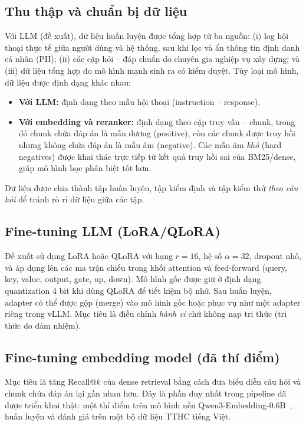 \subsection{Thu thập và chuẩn bị dữ liệu}

Với LLM (đề xuất), dữ liệu huấn luyện được tổng hợp từ ba nguồn: (i) log hội thoại thực tế
giữa người dùng và hệ thống, sau khi lọc và ẩn thông tin định danh cá nhân (PII); (ii) các
cặp hỏi -- đáp chuẩn do chuyên gia nghiệp vụ xây dựng; và (iii) dữ liệu tổng hợp do mô hình
mạnh sinh ra có kiểm duyệt. Tùy loại mô hình, dữ liệu được định dạng khác nhau:

\begin{itemize}
  \item \textbf{Với LLM:} định dạng theo mẫu hội thoại (instruction -- response).
  \item \textbf{Với embedding và reranker:} định dạng theo cặp truy vấn -- chunk, trong đó
  chunk chứa đáp án là mẫu dương (positive), còn các chunk được truy hồi nhưng không chứa
  đáp án là mẫu âm (negative). Các mẫu âm \emph{khó} (hard negatives) được khai thác trực
  tiếp từ kết quả truy hồi sai của BM25/dense, giúp mô hình học phân biệt tốt hơn.
\end{itemize}

Dữ liệu được chia thành tập huấn luyện, tập kiểm định và tập kiểm thử \emph{theo câu hỏi}
để tránh rò rỉ dữ liệu giữa các tập.

\subsection{Fine-tuning LLM (LoRA/QLoRA)}

Đề xuất sử dụng LoRA hoặc QLoRA với hạng $r=16$, hệ số $\alpha=32$, dropout nhỏ, và áp dụng
lên các ma trận chiếu trong khối attention và feed-forward (query, key, value, output,
gate, up, down). Mô hình gốc được giữ ở định dạng quantization 4 bit khi dùng QLoRA để tiết
kiệm bộ nhớ. Sau huấn luyện, adapter có thể được gộp (merge) vào mô hình gốc hoặc phục vụ
như một adapter riêng trong vLLM. Mục tiêu là điều chỉnh \emph{hành vi} chứ không nạp tri
thức (tri thức do \rag{} đảm nhiệm).

\subsection{Fine-tuning embedding model (đã thí điểm)}

Mục tiêu là tăng Recall@$k$ của dense retrieval bằng cách đưa biểu diễn câu hỏi và chunk
chứa đáp án lại gần nhau hơn. Đây là phần duy nhất trong pipeline \ft{} đã được triển khai
thật: một thí điểm trên mô hình nền Qwen3-Embedding-0.6B~\cite{qwen3embedding2025}, huấn
luyện và đánh giá trên một bộ dữ liệu TTHC tiếng Việt.

